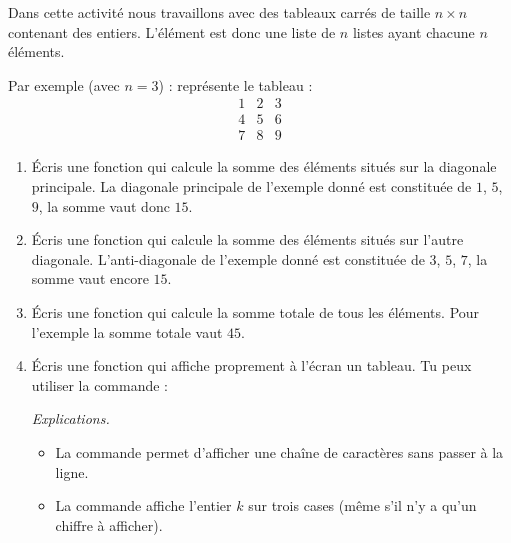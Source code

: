 \documentclass[11pt,class=report,crop=false]{standalone}
\begin{document}

\begin{activite}[Tableau]


Dans cette activité nous travaillons avec des tableaux carrés de taille $n \times n$ contenant des entiers.
L'élément  est donc une liste de $n$ listes ayant chacune $n$ éléments.

Par exemple (avec $n=3$) : 
représente le tableau :
$$\begin{array}{ccc}1&2&3\\4&5&6\\7&8&9\end{array}$$

\begin{enumerate}
  \item Écris une fonction  qui calcule la somme des éléments situés sur la diagonale principale.
  La diagonale principale de l'exemple donné est constituée de $1$, $5$, $9$, la somme vaut donc $15$.
  
  \item Écris une fonction  qui calcule la somme des éléments situés sur l'autre diagonale.
  L'anti-diagonale de l'exemple donné est constituée de $3$, $5$, $7$, la somme vaut encore $15$.
  
  \item Écris une fonction  qui calcule la somme totale de tous les éléments. Pour l'exemple la somme totale vaut $45$.
  
  \item  Écris une fonction  qui affiche proprement à l'écran un tableau. Tu peux utiliser la commande :

\emph{Explications.}
\begin{itemize}
  \item La commande  permet d'afficher une chaîne de caractères sans passer à la ligne.
  
  \item La commande  affiche l'entier $k$ sur trois cases (même s'il n'y a qu'un chiffre à afficher).
\end{itemize}  
\end{enumerate}

\end{activite}
\end{document}
